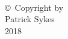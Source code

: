 
\thispagestyle{empty}
\hbox{\ }

\vfill
\renewcommand{\baselinestretch}{1}
\small\normalsize

\vspace{-.65in}

\begin{center}
\large{\copyright \hbox{ }Copyright by\\
Patrick Sykes  %
\\
2018}
\end{center}

\vfill
